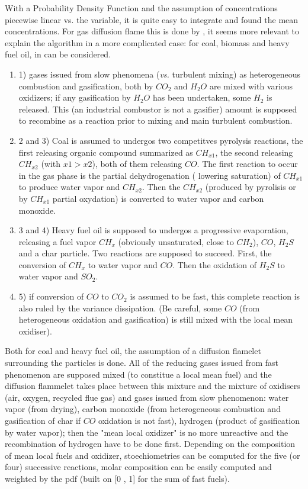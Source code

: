 With a Probability Density Function and the assumption of concentrations
piecewise linear vs. the variable, it is quite easy to integrate and found the
mean concentrations. For gas diffusion flame this is done by , it seems more relevant to explain the algorithm in a more complicated
case: for coal, biomass and heavy fuel oil, in  can be considered.
\begin{enumerate}
\item 1) gases issued from slow phenomena (\emph{vs.} turbulent mixing) as
  heterogeneous combustion and gasification, both by $CO_{2}$ and $H_{2}O$ are
  mixed with various oxidizers; if any gasification by $H_{2}O$ has been
  undertaken, some $H_{2}$ is released. This (an industrial combustor is
  not a gasifier) amount is supposed to recombine as a reaction prior to mixing
  and main turbulent combustion.
\item 2 and 3) Coal is assumed to undergos two competitves pyrolysis reactions,
  the first releasing organic compound summarized as $CH_{x1}$, the second
  releasing $CH_{x2}$ (with $x1 > x2$), both of them releasing $CO$. The first
  reaction to occur in the gas phase is the partial dehydrogenation ( lowering
  saturation) of $CH_{x1}$ to produce water vapor and $CH_{x2}$. Then the
  $CH_{x2}$ (produced by pyrolisis or by $CH_{x1}$ partial oxydation) is
  converted to water vapor and carbon monoxide.
\item 3 and 4) Heavy fuel oil is supposed to undergos a progressive evaporation,
  releasing a fuel vapor $CH_{x}$ (obviously unsaturated, close to $CH_{2}$),
  $CO$, $H_{2}S$ and a char particle. Two reactions are supposed to
  succeed. First, the conversion of $CH_{x}$ to water vapor and $CO$. Then the
  oxidation of $H_{2}S$ to water vapor and $SO_{2}$.
\item 5) if conversion of $CO$ to $CO_{2}$ is assumed to be fast, this complete
  reaction is also ruled by the variance dissipation. (Be careful, some $CO$
  (from heterogeneous oxidation and gasification) is still mixed with the local
  mean oxidiser).
\end{enumerate}
Both for coal and heavy fuel oil, the assumption of a diffusion flamelet
surrounding the particles is done. All of the reducing gases issued from fast
phenomenon are supposed mixed (to constitue a local mean fuel) and the diffusion
flammelet takes place between this mixture and the mixture of oxidisers (air,
oxygen, recycled flue gas) and gases issued from slow phenomenon: water vapor
(from drying), carbon monoxide (from heterogeneous combustion and gasification
of char if $CO$ oxidation is not fast), hydrogen (product of gasification by water
vapor); then the "mean local oxidizer" is no more unreactive and the
recombination of hydrogen have to be done first. Depending on the composition of
mean local fuels and oxidizer, stoechiometries can be computed for the five (or
four) successive reactions, molar composition can be easily computed and
weighted by the pdf (built on [0 , 1] for the sum of fast fuels).

